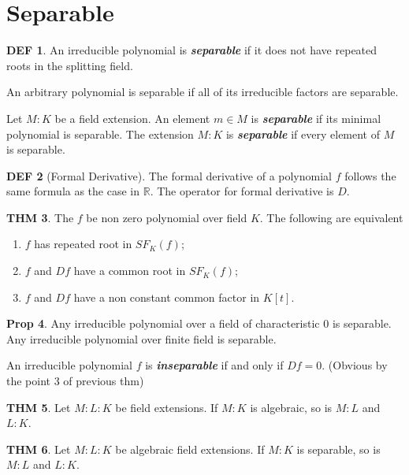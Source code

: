 \documentclass[twocolumn]{article}
\renewcommand{\emph}[1]{\textbf{\textit{#1}}}
\newcommand{\R}{\mathbb{R}}
\theoremstyle{definition}
\newtheorem{thm}{THM}
\newtheorem{prop}[thm]{Prop}
\newtheorem{defi}[thm]{DEF}
\theoremstyle{remark}
\begin{document}
\section{Separable}

\begin{defi}
	An irreducible polynomial is \emph{separable} if it does not have repeated roots in the splitting field.

	An arbitrary polynomial is separable if all of its irreducible factors are separable.

	Let $M:K$ be a field extension. 
	An element $m \in M$ is \emph{separable} if its minimal polynomial is separable.
	The extension $M:K$ is \emph{separable} if every element of $M$ is separable.
\end{defi}


\begin{defi}[Formal Derivative]
	The formal derivative of a polynomial $f$ follows the same formula as the case in $\R$.
	The operator for formal derivative is $D$.
\end{defi}

\begin{thm}
	The $f$ be non zero polynomial over field $K$. The following are equivalent 
	\begin{enumerate}
		\item $f$ has repeated root in $SF_K(f)$;
		\item $f$ and $Df$ have a common root in $SF_K(f)$;
		\item $f$ and $Df$ have a non constant common factor in $K[t]$.
	\end{enumerate}
\end{thm}

\begin{prop}
	Any irreducible polynomial over a field of characteristic $0$ is separable.
	Any irreducible polynomial over finite field is separable.

	An irreducible polynomial $f$ is \emph{inseparable} if and only if $Df = 0$. (Obvious by the point 3 of previous thm)
\end{prop}

\begin{thm}
	Let $M:L:K$ be field extensions. 
	If $M:K$ is algebraic, so is $M:L$ and $L:K$.
\end{thm}

\begin{thm}
	Let $M:L:K$ be algebraic field extensions. 
	If $M:K$ is separable, so is $M:L$ and $L:K$.
\end{thm}
\end{document}
